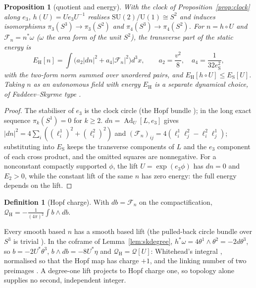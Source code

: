 \documentclass[aps,pra,onecolumn,superscriptaddress,nofootinbib,10pt]{revtex4-2}
\newtheorem{proposition}[theorem]{Proposition}
\theoremstyle{definition}
\newtheorem{definition}[theorem]{Definition}
\theoremstyle{remark}
\newcommand{\Ad}{\operatorname{Ad}}
\newcommand{\SU}{\mathrm{SU}}
\newcommand{\U}{\mathrm{U}}
\begin{document}
\begin{proposition}[quotient and energy]\label{prop:skhopf}
With the clock of Proposition~\ref{prop:clock} along $e_3$, $h(U)=Ue_3U^{-1}$ realises $\SU(2)/\U(1)\cong S^2$ and induces
isomorphisms $\pi_3(S^3)\to\pi_3(S^2)$ and $\pi_4(S^3)\to\pi_4(S^2)$.  For $n=h\circ U$ and $\mathcal F_n=n^*\omega$ ($\omega$ the area form of the unit
$S^2$), the transverse part of the static energy is
\[
E_{\mathrm H}[n]=\int\bigl(a_2\lvert dn\rvert^2+a_4\lvert\mathcal F_n\rvert^2\bigr)d^3x,\qquad a_2=\frac{v^2}8,\quad a_4=\frac1{32e_{\mathrm S}^2},
\]
with the two-form norm summed over unordered pairs, and $E_{\mathrm H}[h\circ U]\le E_{\mathrm S}[U]$.  Taking $n$ as an autonomous field
with energy $E_{\mathrm H}$ is a separate dynamical choice, of Faddeev--Skyrme type \cite{n6:faddeev-niemi}.
\end{proposition}
\begin{proof}
The stabiliser of $e_3$ is the clock circle (the Hopf bundle \cite{n6:hopf-original}); in the long exact sequence
$\pi_k(S^1)=0$ for $k\ge2$.  $dn=\Ad_U[L,e_3]$ gives $\lvert dn\rvert^2=4\sum_i((\ell^1_i)^2+(\ell^2_i)^2)$ and
$(\mathcal F_n)_{ij}=4(\ell^1_i\ell^2_j-\ell^2_i\ell^1_j)$; substituting into $E_{\mathrm S}$ keeps the transverse components of $L$ and the $e_3$
component of each cross product, and the omitted squares are nonnegative.  For a nonconstant compactly
supported $\phi$, the lift $U=\exp(e_3\phi)$ has $dn=0$ and $E_2>0$, while the constant lift of the same $n$ has zero
energy: the full energy depends on the lift.
\end{proof}

\begin{definition}[Hopf charge]\label{def:hopfcharge}
With $d b=\mathcal F_n$ on the compactification, $\mathcal Q_{\mathrm H}=-\frac1{(4\pi)^2}\int b\wedge db$.
\end{definition}
\noindent Every smooth based $n$ has a smooth based lift (the pulled-back circle bundle over $S^3$ is trivial
\cite[\S1.2]{n6:bundles}).  In the coframe of Lemma~\ref{lem:skdegree}, $h^*\omega=4\theta^1\wedge\theta^2=-2d\theta^3$, so $b=-2U^*\theta^3$,
$b\wedge db=-8U^*\eta$ and $\mathcal Q_{\mathrm H}=\mathcal Q[U]$: Whitehead's integral \cite{n6:whitehead}, normalised so that the Hopf map has charge
$+1$, and the linking number of two preimages \cite{n6:hopf-original}.  A degree-one lift projects to Hopf
charge one, so topology alone supplies no second, independent integer.
\end{document}
